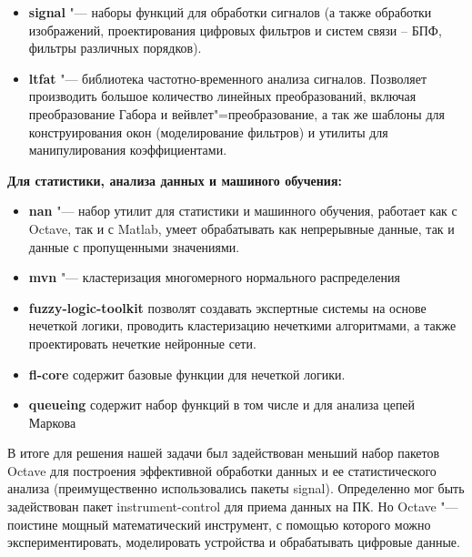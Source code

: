 \documentclass[10pt, a5paper]{article}
\begin{document}
\begin{itemize}
  \item \textbf{signal} "--- наборы функций для обработки сигналов (а также обработки изображений, проектирования цифровых фильтров и систем связи -- БПФ, фильтры различных порядков).
  \item \textbf{ltfat} "--- библиотека частотно-временного анализа сигналов. \linebreak Позволяет производить большое количество линейных преобразований, включая преобразование Габора и вейвлет"=преобразование, а так же шаблоны для конструирования окон (моделирование фильтров) и утилиты для манипулирования коэффициентами.
\end{itemize}

\textbf{Для статистики, анализа данных и машиного обучения:}

\begin{itemize}
  \item \textbf{nan} "--- набор утилит для статистики и машинного обучения, работает как с Octave, так и с Matlab, умеет обрабатывать как непрерывные данные, так и данные с пропущенными значениями.
  \item \textbf{mvn} "--- кластеризация многомерного нормального распределения
  \item \textbf{fuzzy-logic-toolkit} позволят создавать экспертные системы на основе нечеткой логики, проводить кластеризацию нечеткими алгоритмами, а также проектировать нечеткие нейронные сети.
  \item \textbf{fl-core} содержит базовые функции для нечеткой логики.
  \item \textbf{queueing} содержит набор функций в том числе и для анализа цепей Маркова
\end{itemize}

В итоге для решения нашей задачи был задействован меньший набор пакетов Octave для построения эффективной обработки данных и ее статистического анализа (преимущественно использовались пакеты signal). Определенно мог быть задействован пакет instrument-control для приема данных на ПК.
Но Octave "--- поистине мощный математический инструмент, с помощью которого можно экспериментировать, моделировать устройства и обрабатывать цифровые данные.
\end{document}

